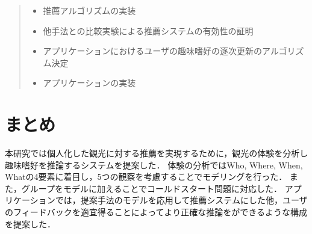 \documentclass[a4j,10pt, twocolumn]{jarticle}
\begin{document}
\begin{quote}
  \begin{itemize}
    \item 推薦アルゴリズムの実装
    \item 他手法との比較実験による推薦システムの有効性の証明
    \item アプリケーションにおけるユーザの趣味嗜好の逐次更新のアルゴリズム決定
    \item アプリケーションの実装
  \end{itemize}
\end{quote}

\section{まとめ} \label{summary}
本研究では個人化した観光に対する推薦を実現するために，観光の体験を分析し趣味嗜好を推論するシステムを提案した．
体験の分析ではWho, Where, When, Whatの4要素に着目し，5つの観察を考慮することでモデリングを行った．
また，グループをモデルに加えることでコールドスタート問題に対応した．
アプリケーションでは，提案手法のモデルを応用して推薦システムにした他，ユーザのフィードバックを適宜得ることによってより正確な推論をができるような構成を提案した．



\end{document}
